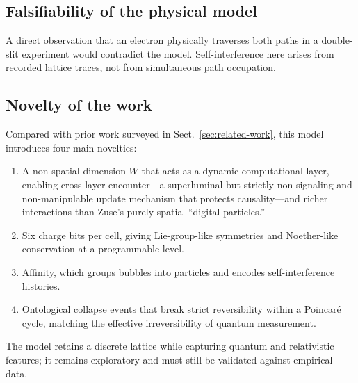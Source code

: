 \documentclass{ijuc}
\begin{document}
\subsection{Falsifiability of the physical model}
A direct observation that an electron physically traverses both paths in a double-slit experiment would contradict the model. Self-interference here arises from recorded lattice traces, not from simultaneous path occupation.
\subsection{Novelty of the work}
Compared with prior work surveyed in Sect.~\ref{sec:related-work}, this model introduces four main novelties:
\begin{enumerate}
\item A non-spatial dimension $W$ that acts as a dynamic computational layer, enabling cross-layer encounter---a superluminal but strictly non-signaling and non-manipulable update mechanism that protects causality---and richer interactions than Zuse's purely spatial ``digital particles.''
\item Six charge bits per cell, giving Lie-group-like symmetries and Noether-like conservation at a programmable level.
\item Affinity, which groups bubbles into particles and encodes self-interference histories.
\item Ontological collapse events that break strict reversibility within a Poincar\'{e} cycle, matching the effective irreversibility of quantum measurement.
\end{enumerate}
The model retains a discrete lattice while capturing quantum and relativistic features; it remains exploratory and must still be validated against empirical data.
\end{document}
